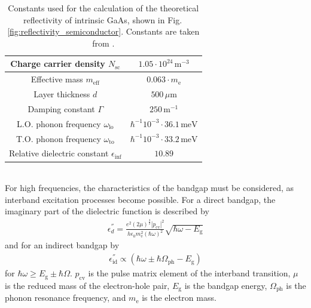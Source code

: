 \begin{table}[h]
    \centering
    \begin{tabular}{c|c}
        \hline\hline
        Charge carrier density $N_\text{sc}$ & $1.05\cdot10^{24}\,\text{m}^{-3}$ \\ \hline
        Effective mass $m_\text{eff}$ & $0.063\cdot m_\text{e}$ \\ \hline
        Layer thickness $d$ & $500\,\mu\text{m}$ \\ \hline
        Damping constant $\Gamma$ & $250\,\text{m}^{-1}$ \\ \hline
        L.O. phonon frequency $\omega_\text{lo}$ & $\hbar^{-1}10^{-3}\cdot36.1\,\text{meV}$ \\ \hline
        T.O. phonon frequency $\omega_\text{to}$ & $\hbar^{-1}10^{-3}\cdot33.2\,\text{meV}$ \\ \hline
        Relative dielectric constant $\epsilon_{\inf}$ & $10.89$ \\ \hline\hline
    \end{tabular}
    \caption{Constants used for the calculation of the theoretical reflectivity of intrinsic GaAs, shown in Fig.\,\ref{fig:reflectivity_semiconductor}. Constants are taken from \cite{ioffe}.}
    \label{tab:metalConstants}
\end{table}\\
For high frequencies, the characteristics of the bandgap must be considered, as interband excitation processes become possible. For a direct bandgap, the imaginary part of the dielectric function is described by
\begin{align}
    \epsilon^{''}_d = \frac{e^2(2\mu)^{\frac{3}{2}}|p_\text{cv}|^2}{h\epsilon_0m_\text{e}^2(\hbar\omega)^2}\sqrt{\hbar\omega-E_\text{g}} \label{eq:epsilon_d}
\end{align}
and for an indirect bandgap by
\begin{align}
    \epsilon^{''}_\text{id} \propto (\hbar\omega\pm\hbar\Omega_\text{ph}-E_\text{g}) \label{eq:epsilon_id}
\end{align}
for $\hbar\omega \geq E_\text{g}\pm\hbar\Omega$. $p_\text{cv}$ is the pulse matrix element of the interband transition, $\mu$ is the reduced mass of the electron-hole pair, $E_\text{g}$ is the bandgap energy, $\Omega_\text{ph}$ is the phonon resonance frequency, and $m_\text{e}$ is the electron mass.
